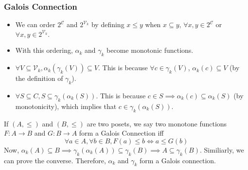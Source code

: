 \documentclass{beamer}
\begin{document}
{        \begin{frame}
            \frametitle{Galois Connection}
            \begin{itemize}
                \item We can order $2^{\mathcal{C}}$ and $2^{\mathcal{V}_{k}}$ by defining $x \leq y$ when $x \subseteq y$, $\forall x, y \in 2^{\mathcal{C}}$ or $\forall x, y \in 2^{\mathcal{V}_{k}}$.
                \item With this ordering, $\alpha_{k}$ and $\gamma_{k}$ become monotonic functions.
                \item $\forall V \subseteq \mathcal{V}_{k}, \alpha_{k}(\gamma_{k}(V)) \subseteq V$. This is because $\forall c \in \gamma_{k}(V)$, $\alpha_{k}(c) \subseteq V$ (by the definition of $\gamma_{k}$).
                \item $\forall S \subseteq C, S \subseteq \gamma_{k}(\alpha_{k}(S))$. This is because $c \in S \implies \alpha_{k}(c) \subseteq \alpha_{k}(S)$ (by monotonicity), which implies that $c \in \gamma_{k}(\alpha_{k}(S))$.
            \end{itemize}
            If $(A, \leq)$ and $(B, \leq)$ are two posets, we say two monotone functions $F: A \rightarrow B$ and $G: B \rightarrow A$ form a Galois Connection iff
            \begin{equation*}
                \forall a \in A, \forall b \in B, F(a) \leq b \Leftrightarrow a \leq G(b)
            \end{equation*}
            Now, $\alpha_{k}(A) \subseteq B \implies \gamma_{k}(\alpha_{k}(A)) \subseteq \gamma_{k}(B) \implies A \subseteq \gamma_{k}(B)$. Similiarly, we can prove the converse. Therefore, $\alpha_{k}$ and $\gamma_{k}$ form a Galois connection.
        \end{frame}

}
\end{document}
